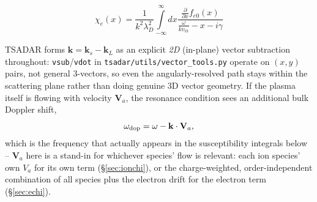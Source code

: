 \documentclass[11pt]{article}
\newcommand{\code}[1]{\texttt{#1}}
\newcommand{\file}[1]{\texttt{#1}}
\begin{document}
\begin{equation}\label{chix}
    \chi_e(x)=\frac{1}{k^2 \lambda_{D}^2} \int\limits_{-\infty}^{\infty} dx \frac{\frac{\partial}{\partial x} f_{e0}(x)}{\frac{\omega}{kv_{th}}-x-i\gamma}
\end{equation}{}

TSADAR forms $\mathbf k=\mathbf k_s-\mathbf k_L$ as an explicit \emph{2D} (in-plane) vector
subtraction throughout: \code{vsub}/\code{vdot} in \file{tsadar/utils/vector\_tools.py}
operate on $(x,y)$ pairs, not general 3-vectors, so even the angularly-resolved path stays
within the scattering plane rather than doing genuine 3D vector geometry. If the plasma
itself is flowing with velocity $\mathbf V_a$, the resonance condition sees an additional
bulk Doppler shift,
\begin{equation}
  \omega_{\rm dop} = \omega-\mathbf k\cdot\mathbf V_a,
\end{equation}
which is the frequency that actually appears in the susceptibility integrals below --
$\mathbf V_a$ here is a stand-in for whichever species' flow is relevant: each ion
species' own $V_a$ for its own term (\S\ref{sec:ionchi}), or the charge-weighted,
order-independent combination of all species plus the electron drift for the electron term
(\S\ref{sec:echi}).
\end{document}
